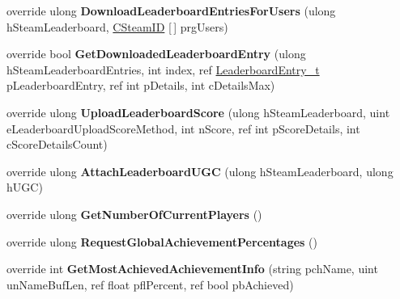 \begin{DoxyCompactItemize}
override ulong {\bfseries Download\+Leaderboard\+Entries\+For\+Users} (ulong h\+Steam\+Leaderboard, \hyperlink{struct_valve_1_1_steamworks_1_1_c_steam_i_d}{C\+Steam\+ID} \mbox{[}$\,$\mbox{]} prg\+Users)
\item 
\mbox{\label{class_valve_1_1_steamworks_1_1_c_steam_user_stats_aa8a9a47478ec16688a0a0eda62219366}} 
override bool {\bfseries Get\+Downloaded\+Leaderboard\+Entry} (ulong h\+Steam\+Leaderboard\+Entries, int index, ref \hyperlink{struct_valve_1_1_steamworks_1_1_leaderboard_entry__t}{Leaderboard\+Entry\+\_\+t} p\+Leaderboard\+Entry, ref int p\+Details, int c\+Details\+Max)
\item 
\mbox{\label{class_valve_1_1_steamworks_1_1_c_steam_user_stats_af1a99475793c5e1fc86899a899b2784c}} 
override ulong {\bfseries Upload\+Leaderboard\+Score} (ulong h\+Steam\+Leaderboard, uint e\+Leaderboard\+Upload\+Score\+Method, int n\+Score, ref int p\+Score\+Details, int c\+Score\+Details\+Count)
\item 
\mbox{\label{class_valve_1_1_steamworks_1_1_c_steam_user_stats_a9c060611a45fece363544dd859308110}} 
override ulong {\bfseries Attach\+Leaderboard\+U\+GC} (ulong h\+Steam\+Leaderboard, ulong h\+U\+GC)
\item 
\mbox{\label{class_valve_1_1_steamworks_1_1_c_steam_user_stats_a18c40e4bb2b97c84fabca2ee5d58bd56}} 
override ulong {\bfseries Get\+Number\+Of\+Current\+Players} ()
\item 
\mbox{\label{class_valve_1_1_steamworks_1_1_c_steam_user_stats_ac45c85b00fb30be99b77b8b29f4d6e09}} 
override ulong {\bfseries Request\+Global\+Achievement\+Percentages} ()
\item 
\mbox{\label{class_valve_1_1_steamworks_1_1_c_steam_user_stats_a4ad3eb1958edf6312bf293cb3594704d}} 
override int {\bfseries Get\+Most\+Achieved\+Achievement\+Info} (string pch\+Name, uint un\+Name\+Buf\+Len, ref float pfl\+Percent, ref bool pb\+Achieved)
\item 
\mbox{\label{class_valve_1_1_steamworks_1_1_c_steam_user_stats_a13dd533a55c5428945a4ec5cf726f3e4}} 

\end{DoxyCompactItemize}
